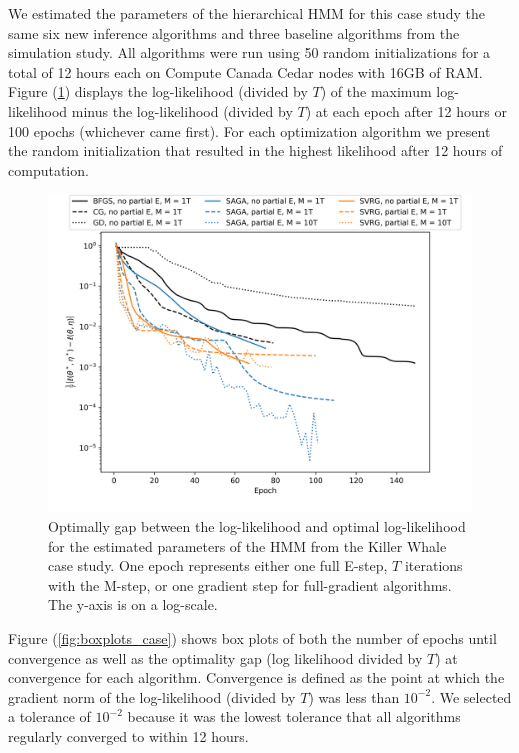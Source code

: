 We estimated the parameters of the hierarchical HMM for this case study the same six new inference algorithms and three baseline algorithms from the simulation study.
%
All algorithms were run using 50 random initializations for a total of 12 hours each on Compute Canada Cedar nodes with 16GB of RAM.
%
Figure (\ref{fig:ll_trace_case}) displays the log-likelihood (divided by $T$) of the maximum log-likelihood minus the log-likelihood (divided by $T$) at each epoch after 12 hours or 100 epochs (whichever came first). For each optimization algorithm we present the random initialization that resulted in the highest likelihood after 12 hours of computation.
%
\begin{figure}
    \centering
    \includegraphics[width=6in]{../plt/log-like_v_epoch_K-3-3.png}
    \caption{Optimally gap between the log-likelihood and optimal log-likelihood for the estimated parameters of the HMM from the Killer Whale case study. One epoch represents either one full E-step, $T$ iterations with the M-step, or one gradient step for full-gradient algorithms. The y-axis is on a log-scale.}
    \label{fig:ll_trace_case}
\end{figure}
%
Figure (\ref{fig:boxplots_case}) shows box plots of both the number of epochs until convergence as well as the optimality gap (log likelihood divided by $T$) at convergence for each algorithm. Convergence is defined as the point at which the gradient norm of the log-likelihood (divided by $T$) was less than $10^{-2}$. We selected a tolerance of $10^{-2}$ because it was the lowest tolerance that all algorithms regularly converged to within 12 hours. 
%
